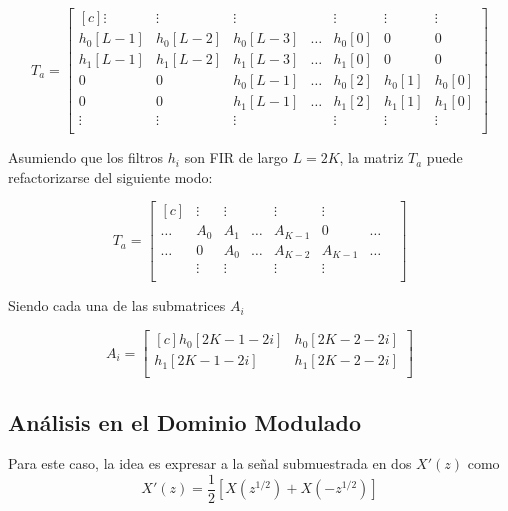 	\begin{equation}
		T_a=
		\begin{bmatrix*}[c]
			\vdots & \vdots & \vdots & & \vdots & \vdots & \vdots\\
			h_0[L-1] & h_0[L-2] & h_0[L-3] & \hdots & h_0[0] & 0 & 0 \\
			h_1[L-1] & h_1[L-2] & h_1[L-3] & \hdots & h_1[0] & 0 & 0 \\
			0 & 0 & h_0[L-1] & \hdots & h_0[2] & h_0[1] & h_0[0] \\
			0 & 0 & h_1[L-1] & \hdots & h_1[2] & h_1[1] & h_1[0] \\
			\vdots & \vdots & \vdots & & \vdots & \vdots & \vdots \\
		\end{bmatrix*}
	\end{equation}

Asumiendo que los filtros $h_i$ son FIR de largo $L=2K$, la matriz $T_a$ puede refactorizarse del siguiente modo:

	\begin{equation}
		T_a=
		\begin{bmatrix*}[c]
			 & \vdots & \vdots &  & \vdots & \vdots & &\\
			\hdots & A_0 & A_1 & \hdots & A_{K-1} & 0 & \hdots  \\
			\hdots & 0 & A_0 & \hdots & A_{K-2} & A_{K-1} & \hdots  \\
			 & \vdots & \vdots &  & \vdots & \vdots & &\\		
		\end{bmatrix*}
	\end{equation}

Siendo cada una de las submatrices $A_i$

	\begin{equation}
		A_i=
		\begin{bmatrix*}[c]
			h_0[2K-1-2i] & h_0[2K-2-2i] \\
			h_1[2K-1-2i] & h_1[2K-2-2i] \\
		\end{bmatrix*}
	\end{equation}
	

\subsection{Análisis en el Dominio Modulado}

	Para este caso, la idea es expresar a la señal submuestrada en dos $X'(z)$ como
		\begin{equation}
			X'(z)=\frac{1}{2}[X(z^{1/2})+X(-z^{1/2})]
		\end{equation}

